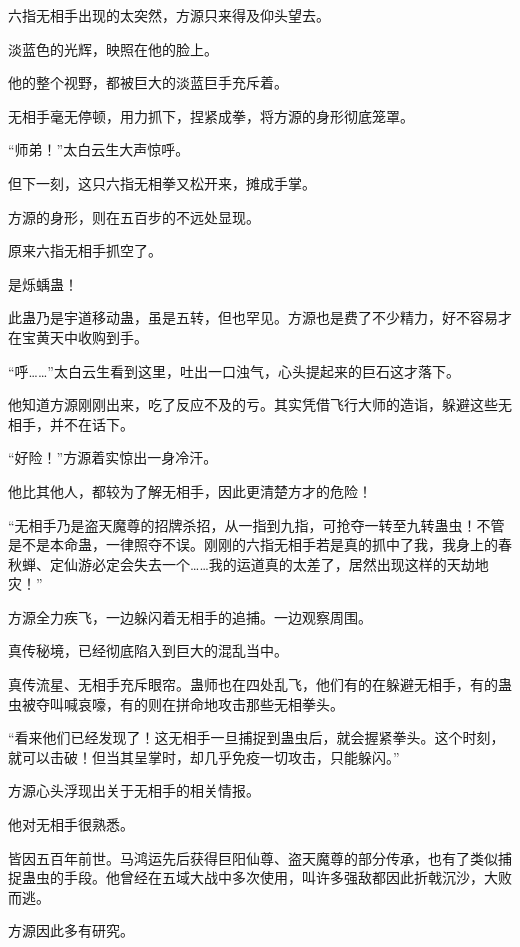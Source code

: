 
\begin{this_body}

六指无相手出现的太突然，方源只来得及仰头望去。

淡蓝色的光辉，映照在他的脸上。

他的整个视野，都被巨大的淡蓝巨手充斥着。

无相手毫无停顿，用力抓下，捏紧成拳，将方源的身形彻底笼罩。

“师弟！”太白云生大声惊呼。

但下一刻，这只六指无相拳又松开来，摊成手掌。

方源的身形，则在五百步的不远处显现。

原来六指无相手抓空了。

是烁蝺蛊！

此蛊乃是宇道移动蛊，虽是五转，但也罕见。方源也是费了不少精力，好不容易才在宝黄天中收购到手。

“呼……”太白云生看到这里，吐出一口浊气，心头提起来的巨石这才落下。

他知道方源刚刚出来，吃了反应不及的亏。其实凭借飞行大师的造诣，躲避这些无相手，并不在话下。

“好险！”方源着实惊出一身冷汗。

他比其他人，都较为了解无相手，因此更清楚方才的危险！

“无相手乃是盗天魔尊的招牌杀招，从一指到九指，可抢夺一转至九转蛊虫！不管是不是本命蛊，一律照夺不误。刚刚的六指无相手若是真的抓中了我，我身上的春秋蝉、定仙游必定会失去一个……我的运道真的太差了，居然出现这样的天劫地灾！”

方源全力疾飞，一边躲闪着无相手的追捕。一边观察周围。

真传秘境，已经彻底陷入到巨大的混乱当中。

真传流星、无相手充斥眼帘。蛊师也在四处乱飞，他们有的在躲避无相手，有的蛊虫被夺叫喊哀嚎，有的则在拼命地攻击那些无相拳头。

“看来他们已经发现了！这无相手一旦捕捉到蛊虫后，就会握紧拳头。这个时刻，就可以击破！但当其呈掌时，却几乎免疫一切攻击，只能躲闪。”

方源心头浮现出关于无相手的相关情报。

他对无相手很熟悉。

皆因五百年前世。马鸿运先后获得巨阳仙尊、盗天魔尊的部分传承，也有了类似捕捉蛊虫的手段。他曾经在五域大战中多次使用，叫许多强敌都因此折戟沉沙，大败而逃。

方源因此多有研究。


\end{this_body}
